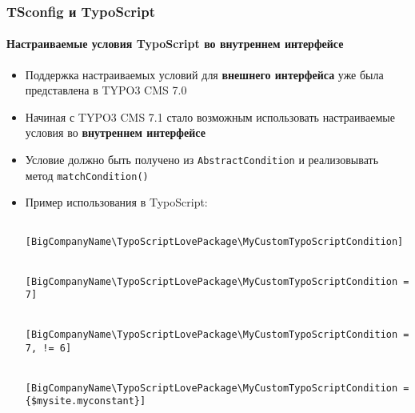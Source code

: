 
\begin{frame}[fragile]
	\frametitle{TSconfig и TypoScript}
	\framesubtitle{Настраиваемые условия TypoScript во внутреннем интерфейсе}

	\lstset{basicstyle=\tiny\ttfamily}

	\begin{itemize}
	
		\item Поддержка настраиваемых условий для \textbf{внешнего интерфейса} уже была представлена в TYPO3 CMS 7.0
		\item Начиная с TYPO3 CMS 7.1 стало возможным использовать настраиваемые условия во \textbf{внутреннем интерфейсе}
		\item Условие должно быть получено из \texttt{AbstractCondition} и реализовывать метод \texttt{matchCondition()}
		\item Пример использования в TypoScript: 

			\begin{lstlisting}
				[BigCompanyName\TypoScriptLovePackage\MyCustomTypoScriptCondition]

				[BigCompanyName\TypoScriptLovePackage\MyCustomTypoScriptCondition = 7]

				[BigCompanyName\TypoScriptLovePackage\MyCustomTypoScriptCondition = 7, != 6]

				[BigCompanyName\TypoScriptLovePackage\MyCustomTypoScriptCondition = {$mysite.myconstant}]
			\end{lstlisting}

	\end{itemize}

\end{frame}


